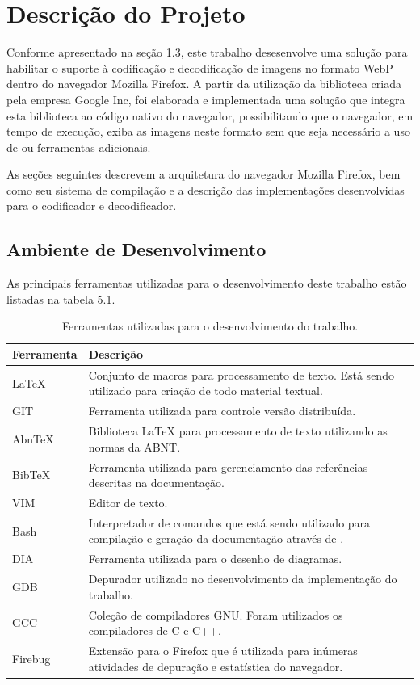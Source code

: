 \documentclass[espaco=simples,appendix=Name]{abnt}
\begin{document}
\chapter{Descrição do Projeto}

Conforme apresentado na seção 1.3, este trabalho desesenvolve uma solução para habilitar o suporte à codificação e decodificação de imagens no formato WebP dentro do navegador Mozilla Firefox. A partir da utilização da biblioteca  criada pela empresa Google Inc, foi elaborada e implementada uma solução que integra esta biblioteca ao código nativo do navegador, possibilitando que o navegador, em tempo de execução, exiba as imagens neste formato sem que seja necessário a uso de  ou ferramentas adicionais.

As seções seguintes descrevem a arquitetura do navegador Mozilla Firefox, bem como seu sistema de compilação e a descrição das implementações desenvolvidas para o codificador e decodificador.

\section{Ambiente de Desenvolvimento}

As principais ferramentas utilizadas para o desenvolvimento deste trabalho estão listadas na tabela 5.1.

\begin{table}[ht]
	\centering
	\caption{Ferramentas utilizadas para o desenvolvimento do trabalho.
	\label{tbl:padc}}{
		\vspace{0.3cm}
		\begin{tabular}{|l|p{14cm}|}
	    	\hline
			\textbf{Ferramenta} & \textbf{Descrição} \\
			\hline
			LaTeX		& Conjunto de macros para processamento de texto. Está sendo utilizado para criação de todo material textual. \\
			\hline
			GIT		& Ferramenta utilizada para controle versão distribuída. \\
			\hline
			AbnTeX		& Biblioteca LaTeX para processamento de texto utilizando as normas da ABNT. \\
			\hline
			BibTeX		& Ferramenta utilizada para gerenciamento das referências descritas na documentação. \\
			\hline
			VIM		& Editor de texto. \\
			\hline
			Bash		& Interpretador de comandos que está sendo utilizado para compilação e geração da documentação através de \ingles{scripts}. \\
			\hline
			DIA		& Ferramenta utilizada para o desenho de diagramas. \\
			\hline
			GDB		& Depurador utilizado no desenvolvimento da implementação do trabalho. \\
			\hline
			GCC		& Coleção de compiladores GNU. Foram utilizados os compiladores de C e C++. \\
			\hline
			Firebug		& Extensão para o Firefox que é utilizada para inúmeras atividades de depuração e estatística do navegador. \\
			\hline
		\end{tabular}
		}
\end{table}
\end{document}
